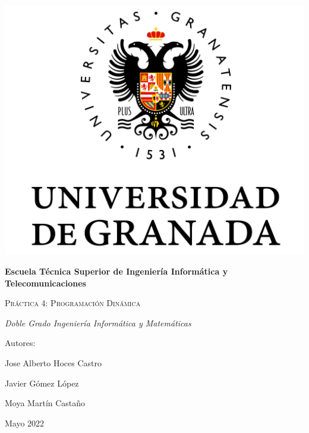 \documentclass[10pt,a4paper]{article}
\begin{document}
	
\begin{titlepage}
	\centering
	{\includegraphics[scale=0.5]{Logo_UGR.png}\par}
	\vspace{1cm}
	{\bfseries\Large Escuela T\'ecnica Superior de Ingeniería Informática y Telecomunicaciones \par}
	\vspace{2.5cm}
	{\scshape\Huge Pr\'actica 4: Programación Dinámica \par}
	\vspace{3cm}
	{\itshape\Large Doble Grado Ingeniería Informática y Matemáticas}
	\vfill
	{\Large Autores: \par}
	{\Large Jose Alberto Hoces Castro\par}
	{\Large Javier Gómez López \par}
	{\Large Moya Mart\'in Castaño \par}
	\vfill
	{\Large Mayo 2022 \par}
\end{titlepage}

\thispagestyle{empty}
\null
\vfill
\end{document}
